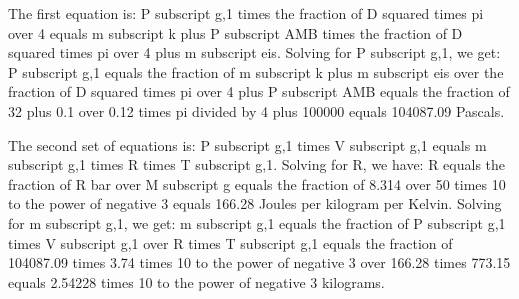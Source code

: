 The first equation is:
P subscript g,1 times the fraction of D squared times pi over 4 equals m subscript k plus P subscript AMB times the fraction of D squared times pi over 4 plus m subscript eis.
Solving for P subscript g,1, we get:
P subscript g,1 equals the fraction of m subscript k plus m subscript eis over the fraction of D squared times pi over 4 plus P subscript AMB equals the fraction of 32 plus 0.1 over 0.12 times pi divided by 4 plus 100000 equals 104087.09 Pascals.

The second set of equations is:
P subscript g,1 times V subscript g,1 equals m subscript g,1 times R times T subscript g,1.
Solving for R, we have:
R equals the fraction of R bar over M subscript g equals the fraction of 8.314 over 50 times 10 to the power of negative 3 equals 166.28 Joules per kilogram per Kelvin.
Solving for m subscript g,1, we get:
m subscript g,1 equals the fraction of P subscript g,1 times V subscript g,1 over R times T subscript g,1 equals the fraction of 104087.09 times 3.74 times 10 to the power of negative 3 over 166.28 times 773.15 equals 2.54228 times 10 to the power of negative 3 kilograms.
